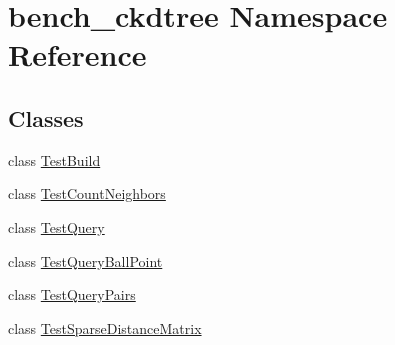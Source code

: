 \hypertarget{namespacebench__ckdtree}{}\section{bench\+\_\+ckdtree Namespace Reference}
\label{namespacebench__ckdtree}
\subsection*{Classes}
\begin{DoxyCompactItemize}
\item 
class \hyperlink{classbench__ckdtree_1_1TestBuild}{Test\+Build}
\item 
class \hyperlink{classbench__ckdtree_1_1TestCountNeighbors}{Test\+Count\+Neighbors}
\item 
class \hyperlink{classbench__ckdtree_1_1TestQuery}{Test\+Query}
\item 
class \hyperlink{classbench__ckdtree_1_1TestQueryBallPoint}{Test\+Query\+Ball\+Point}
\item 
class \hyperlink{classbench__ckdtree_1_1TestQueryPairs}{Test\+Query\+Pairs}
\item 
class \hyperlink{classbench__ckdtree_1_1TestSparseDistanceMatrix}{Test\+Sparse\+Distance\+Matrix}
\end{DoxyCompactItemize}
